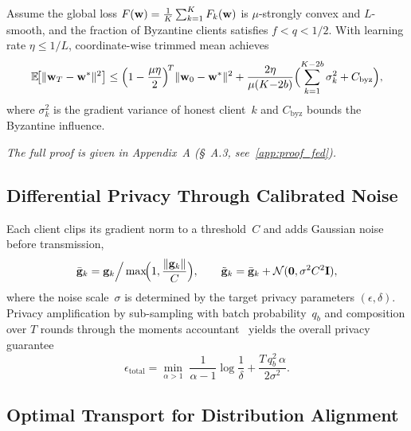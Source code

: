\begin{theorem}
\label{thm:fed_conv}
Assume the global loss $F(\mathbf{w})=\frac{1}{K}\sum_{k=1}^K F_k(\mathbf{w})$ is $\mu$-strongly convex and $L$-smooth, and the fraction of Byzantine clients satisfies $f<q<1/2$. With learning rate $\eta\le 1/L$, coordinate-wise trimmed mean achieves
\begin{equation}
\mathbb{E}\!\bigl[\|\mathbf{w}_T-\mathbf{w}^*\|^2\bigr]
\le \Bigl(1-\frac{\mu\eta}{2}\Bigr)^{\!T}\|\mathbf{w}_0-\mathbf{w}^*\|^2
  + \frac{2\eta}{\mu(K{-}2b)}
    \Bigl(\sum_{k=1}^{K-2b}\sigma_k^2 + C_{\mathrm{byz}}\Bigr),
\label{eq:fed_conv_bound}
\end{equation}
where $\sigma_k^2$ is the gradient variance of honest client~$k$ and $C_{\mathrm{byz}}$ bounds the Byzantine influence.
\end{theorem}

\noindent\textit{The full proof is given in Appendix~A (\S~A.3, see~\ref{app:proof_fed}).}

\subsection{Differential Privacy Through Calibrated Noise}

Each client clips its gradient norm to a threshold~$C$ and adds Gaussian noise~\cite{Abadi2016,Dwork2006,Dwork2014} before transmission,
\begin{equation}
\bar{\mathbf{g}}_k = \mathbf{g}_k\Big/\max\!\Bigl(1,\frac{\|\mathbf{g}_k\|}
{C}\Bigr),
\qquad
\tilde{\mathbf{g}}_k = \bar{\mathbf{g}}_k + \mathcal{N}(\mathbf{0},\sigma^2 C^2\mathbf{I}),
\label{eq:fed_dp_noise}
\end{equation}
where the noise scale~$\sigma$ is determined by the target privacy parameters $(\epsilon,\delta)$. Privacy amplification by sub-sampling with batch probability~$q_b$ and composition over $T$ rounds through the moments accountant~\cite{Mironov2017,Balle2018} yields the overall privacy guarantee
\begin{equation}
\epsilon_{\mathrm{total}}
= \min_{\alpha>1}\;
  \frac{1}{\alpha-1}\log\frac{1}{\delta}
  + \frac{T\,q_b^2\,\alpha}{2\sigma^2}.
\label{eq:fed_privacy}
\end{equation}

\subsection{Optimal Transport for Distribution Alignment}

